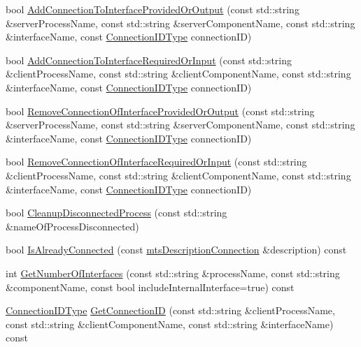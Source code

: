 \begin{DoxyCompactItemize}
\item 
bool \hyperlink{classmts_manager_global_ababac733270efb19c7aaecbe2334c96a}{Add\+Connection\+To\+Interface\+Provided\+Or\+Output} (const std\+::string \&server\+Process\+Name, const std\+::string \&server\+Component\+Name, const std\+::string \&interface\+Name, const \hyperlink{mts_forward_declarations_8h_ad3543bb11742e1766374ec96016d6547}{Connection\+I\+D\+Type} connection\+I\+D)
\item 
bool \hyperlink{classmts_manager_global_abbcbd4b173b16bb526bd6ac3381aa91b}{Add\+Connection\+To\+Interface\+Required\+Or\+Input} (const std\+::string \&client\+Process\+Name, const std\+::string \&client\+Component\+Name, const std\+::string \&interface\+Name, const \hyperlink{mts_forward_declarations_8h_ad3543bb11742e1766374ec96016d6547}{Connection\+I\+D\+Type} connection\+I\+D)
\item 
bool \hyperlink{classmts_manager_global_a81e63fe6a44457f8e867dfeb85a3247d}{Remove\+Connection\+Of\+Interface\+Provided\+Or\+Output} (const std\+::string \&server\+Process\+Name, const std\+::string \&server\+Component\+Name, const std\+::string \&interface\+Name, const \hyperlink{mts_forward_declarations_8h_ad3543bb11742e1766374ec96016d6547}{Connection\+I\+D\+Type} connection\+I\+D)
\item 
bool \hyperlink{classmts_manager_global_acaa9d8d96ff161094790ccfa9e6e3336}{Remove\+Connection\+Of\+Interface\+Required\+Or\+Input} (const std\+::string \&client\+Process\+Name, const std\+::string \&client\+Component\+Name, const std\+::string \&interface\+Name, const \hyperlink{mts_forward_declarations_8h_ad3543bb11742e1766374ec96016d6547}{Connection\+I\+D\+Type} connection\+I\+D)
\item 
bool \hyperlink{classmts_manager_global_a115d9b7e7e1b0125977ac0f737484537}{Cleanup\+Disconnected\+Process} (const std\+::string \&name\+Of\+Process\+Disconnected)
\item 
bool \hyperlink{classmts_manager_global_ab6db0d6f1e9d0717199bdbfdce5141e5}{Is\+Already\+Connected} (const \hyperlink{classmts_description_connection}{mts\+Description\+Connection} \&description) const 
\item 
int \hyperlink{classmts_manager_global_a0e3e1f31090dfa4288608b611bd5c723}{Get\+Number\+Of\+Interfaces} (const std\+::string \&process\+Name, const std\+::string \&component\+Name, const bool include\+Internal\+Interface=true) const 
\item 
\hyperlink{mts_forward_declarations_8h_ad3543bb11742e1766374ec96016d6547}{Connection\+I\+D\+Type} \hyperlink{classmts_manager_global_a1305debbb9848297d7f8079506c6ad75}{Get\+Connection\+I\+D} (const std\+::string \&client\+Process\+Name, const std\+::string \&client\+Component\+Name, const std\+::string \&interface\+Name) const 

\end{DoxyCompactItemize}
